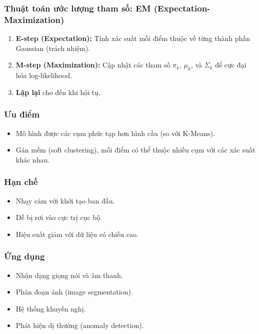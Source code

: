 \subsubsection*{Thuật toán ước lượng tham số: EM (Expectation-Maximization)}

\begin{enumerate}
    \item \textbf{E-step (Expectation):} Tính xác suất mỗi điểm thuộc về từng thành phần Gaussian (trách nhiệm).
    \item \textbf{M-step (Maximization):} Cập nhật các tham số $\pi_k$, $\mu_k$, và $\Sigma_k$ để cực đại hóa log-likelihood.
    \item \textbf{Lặp lại} cho đến khi hội tụ.
\end{enumerate}

\subsubsection*{Ưu điểm}

\begin{itemize}
    \item Mô hình được các cụm phức tạp hơn hình cầu (so với K-Means).
    \item Gán mềm (soft clustering), mỗi điểm có thể thuộc nhiều cụm với các xác suất khác nhau.
\end{itemize}

\subsubsection*{Hạn chế}

\begin{itemize}
    \item Nhạy cảm với khởi tạo ban đầu.
    \item Dễ bị rơi vào cực trị cục bộ.
    \item Hiệu suất giảm với dữ liệu có chiều cao.
\end{itemize}

\subsubsection*{Ứng dụng}

\begin{itemize}
    \item Nhận dạng giọng nói và âm thanh.
    \item Phân đoạn ảnh (image segmentation).
    \item Hệ thống khuyến nghị.
    \item Phát hiện dị thường (anomaly detection).
\end{itemize}

